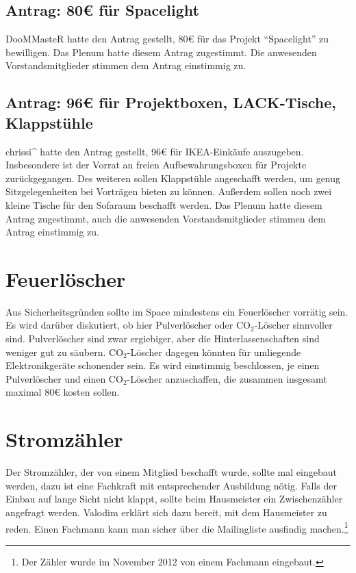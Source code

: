 \documentclass[a4paper,12pt]{scrartcl}
\begin{document}
\subsection{Antrag: 80€ für Spacelight}
DooMMasteR hatte den Antrag gestellt, 80€ für das Projekt "`Spacelight"' zu
bewilligen. Das Plenum hatte diesem Antrag zugestimmt. Die anwesenden
Vorstandsmitglieder stimmen dem Antrag einstimmig zu.

\subsection{Antrag: 96€ für Projektboxen, \textsc{LACK}-Tische, Klappstühle}
chrissi\textasciicircum{} hatte den Antrag gestellt, 96€ für
\textsc{IKEA}-Einkäufe auszugeben. Insbesondere ist der Vorrat an freien
Aufbewahrungsboxen für Projekte zurückgegangen. Des weiteren sollen Klappstühle
angeschafft werden, um genug Sitzgelegenheiten bei Vorträgen bieten zu können.
Außerdem sollen noch zwei kleine Tische für den Sofaraum beschafft werden.
Das Plenum hatte diesem Antrag zugestimmt, auch die anwesenden
Vorstandsmitglieder stimmen dem Antrag einstimmig zu.

\section{Feuerlöscher}
Aus Sicherheitsgründen sollte im Space mindestens ein Feuerlöscher vorrätig
sein. Es wird darüber diskutiert, ob hier Pulverlöscher oder CO$_2$-Löscher
sinnvoller sind. Pulverlöscher sind zwar ergiebiger, aber die
Hinterlassenschaften sind weniger gut zu säubern. CO$_2$-Löscher dagegen
könnten für umliegende Elektronikgeräte schonender sein. Es wird einstimmig
beschlossen, je einen Pulverlöscher und einen CO$_2$-Löscher anzuschaffen,
die zusammen insgesamt maximal 80€ kosten sollen.

\section{Stromzähler}
Der Stromzähler, der von einem Mitglied beschafft wurde, sollte mal eingebaut
werden, dazu ist eine Fachkraft mit entsprechender Ausbildung nötig. Falls der
Einbau auf lange Sicht nicht klappt, sollte beim Hausmeister ein Zwischenzähler
angefragt werden. Valodim erklärt sich dazu bereit, mit dem Hausmeister zu
reden. Einen Fachmann kann man sicher über die Mailingliste ausfindig
machen.\footnote{Der Zähler wurde im November 2012 von einem Fachmann
eingebaut.}
\end{document}
